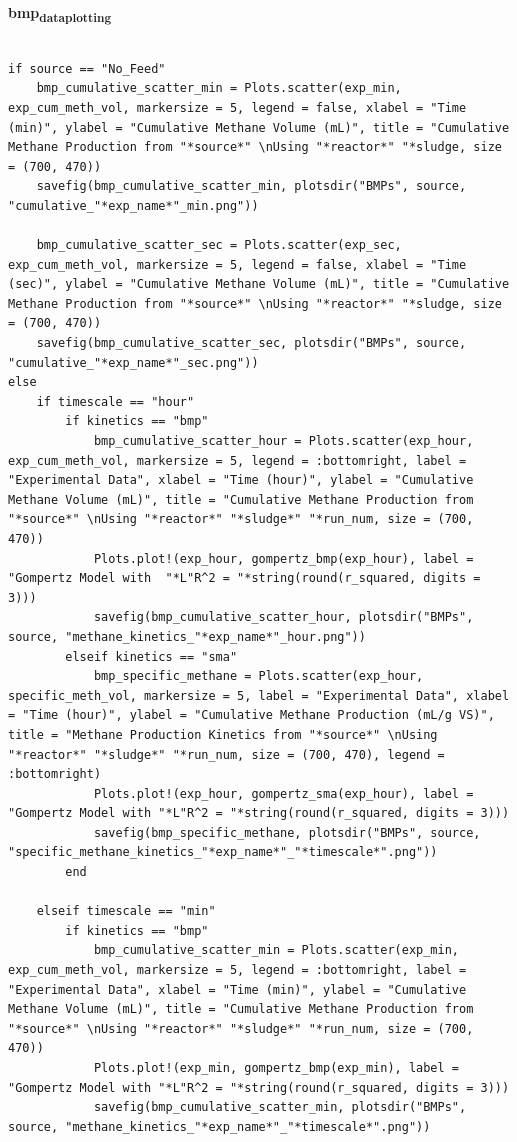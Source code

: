 \documentclass[11pt]{article}
\begin{document}
\textbf{bmp\textsubscript{data}\textsubscript{plotting}}
\begin{verbatim}

if source == "No_Feed"
    bmp_cumulative_scatter_min = Plots.scatter(exp_min, exp_cum_meth_vol, markersize = 5, legend = false, xlabel = "Time (min)", ylabel = "Cumulative Methane Volume (mL)", title = "Cumulative Methane Production from "*source*" \nUsing "*reactor*" "*sludge, size = (700, 470))
    savefig(bmp_cumulative_scatter_min, plotsdir("BMPs", source, "cumulative_"*exp_name*"_min.png"))

    bmp_cumulative_scatter_sec = Plots.scatter(exp_sec, exp_cum_meth_vol, markersize = 5, legend = false, xlabel = "Time (sec)", ylabel = "Cumulative Methane Volume (mL)", title = "Cumulative Methane Production from "*source*" \nUsing "*reactor*" "*sludge, size = (700, 470))
    savefig(bmp_cumulative_scatter_sec, plotsdir("BMPs", source, "cumulative_"*exp_name*"_sec.png"))
else
    if timescale == "hour"
        if kinetics == "bmp"
            bmp_cumulative_scatter_hour = Plots.scatter(exp_hour, exp_cum_meth_vol, markersize = 5, legend = :bottomright, label = "Experimental Data", xlabel = "Time (hour)", ylabel = "Cumulative Methane Volume (mL)", title = "Cumulative Methane Production from "*source*" \nUsing "*reactor*" "*sludge*" "*run_num, size = (700, 470))
            Plots.plot!(exp_hour, gompertz_bmp(exp_hour), label = "Gompertz Model with  "*L"R^2 = "*string(round(r_squared, digits = 3)))
            savefig(bmp_cumulative_scatter_hour, plotsdir("BMPs", source, "methane_kinetics_"*exp_name*"_hour.png"))
        elseif kinetics == "sma"
            bmp_specific_methane = Plots.scatter(exp_hour, specific_meth_vol, markersize = 5, label = "Experimental Data", xlabel = "Time (hour)", ylabel = "Cumulative Methane Production (mL/g VS)", title = "Methane Production Kinetics from "*source*" \nUsing "*reactor*" "*sludge*" "*run_num, size = (700, 470), legend = :bottomright)
            Plots.plot!(exp_hour, gompertz_sma(exp_hour), label = "Gompertz Model with "*L"R^2 = "*string(round(r_squared, digits = 3)))
            savefig(bmp_specific_methane, plotsdir("BMPs", source, "specific_methane_kinetics_"*exp_name*"_"*timescale*".png"))
        end

    elseif timescale == "min"
        if kinetics == "bmp"
            bmp_cumulative_scatter_min = Plots.scatter(exp_min, exp_cum_meth_vol, markersize = 5, legend = :bottomright, label = "Experimental Data", xlabel = "Time (min)", ylabel = "Cumulative Methane Volume (mL)", title = "Cumulative Methane Production from "*source*" \nUsing "*reactor*" "*sludge*" "*run_num, size = (700, 470))
            Plots.plot!(exp_min, gompertz_bmp(exp_min), label = "Gompertz Model with "*L"R^2 = "*string(round(r_squared, digits = 3)))
            savefig(bmp_cumulative_scatter_min, plotsdir("BMPs", source, "methane_kinetics_"*exp_name*"_"*timescale*".png"))


\end{verbatim}
\end{document}
